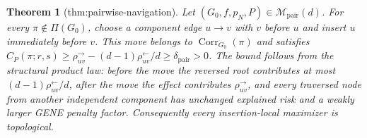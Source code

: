 \documentclass{article}
\newtheorem{theorem}{Theorem}
\begin{document}
\begin{theorem}[thm:pairwise-navigation]\label{thm:pairwise-navigation}
Let \((G_0,f,p_N,P)\in\mathcal M_{\mathrm{pair}}(d)\). For every \(\pi\notin\Pi(G_0)\), choose a component edge \(u\to v\) with \(v\) before \(u\) and insert \(u\) immediately before \(v\). This move belongs to \(\operatorname{Corr}_{G_0}(\pi)\) and satisfies \(C_P(\pi;r,s)\ge\rho^{\to}_{uv}-(d-1)\rho^{\leftarrow}_{uv}/d\ge\delta_{\mathrm{pair}}>0\). The bound follows from the structural product law: before the move the reversed root contributes at most \((d-1)\rho^{\leftarrow}_{uv}/d\), after the move the effect contributes \(\rho^{\to}_{uv}\), and every traversed node from another independent component has unchanged explained risk and a weakly larger GENE penalty factor. Consequently every insertion-local maximizer is topological.
\end{theorem}
\end{document}

